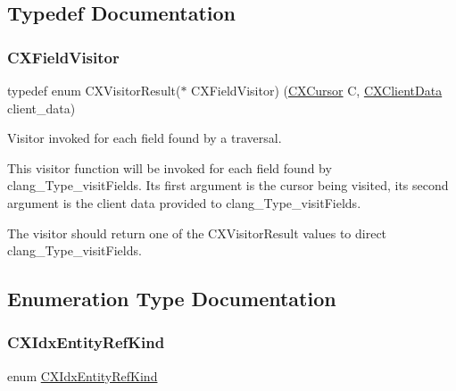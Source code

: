 \subsection{Typedef Documentation}
\mbox{\label{group__CINDEX__HIGH_ga5040863c91d7a720a97569cf869f42a4}} 
\subsubsection{\texorpdfstring{C\+X\+Field\+Visitor}{CXFieldVisitor}}
{\footnotesize\ttfamily typedef enum C\+X\+Visitor\+Result($\ast$ C\+X\+Field\+Visitor) (\mbox{\hyperlink{structCXCursor}{C\+X\+Cursor}} C, \mbox{\hyperlink{group__CINDEX_gacfa40c3de26d228c0d898403c2c21612}{C\+X\+Client\+Data}} client\+\_\+data)}



Visitor invoked for each field found by a traversal. 

This visitor function will be invoked for each field found by {\ttfamily clang\+\_\+\+Type\+\_\+visit\+Fields}. Its first argument is the cursor being visited, its second argument is the client data provided to {\ttfamily clang\+\_\+\+Type\+\_\+visit\+Fields}.

The visitor should return one of the {\ttfamily C\+X\+Visitor\+Result} values to direct {\ttfamily clang\+\_\+\+Type\+\_\+visit\+Fields}. 

\subsection{Enumeration Type Documentation}
\mbox{\label{group__CINDEX__HIGH_ga4158d96205b540d3ef4992cf6689c2aa}} 
\subsubsection{\texorpdfstring{C\+X\+Idx\+Entity\+Ref\+Kind}{CXIdxEntityRefKind}}
{\footnotesize\ttfamily enum \mbox{\hyperlink{group__CINDEX__HIGH_ga4158d96205b540d3ef4992cf6689c2aa}{C\+X\+Idx\+Entity\+Ref\+Kind}}}



